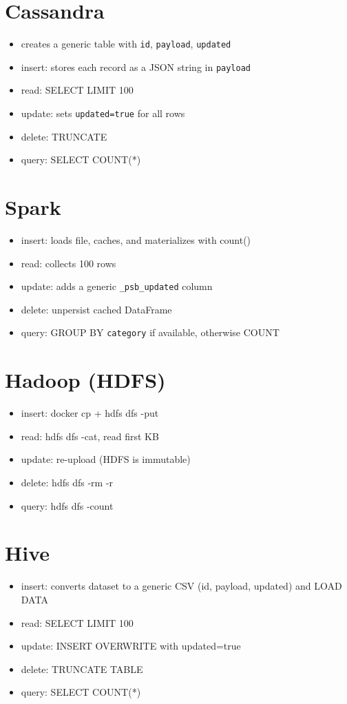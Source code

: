 \documentclass[12pt]{report}
\begin{document}
\section{Cassandra}
\begin{itemize}
  \item creates a generic table with \texttt{id}, \texttt{payload}, \texttt{updated}
  \item insert: stores each record as a JSON string in \texttt{payload}
  \item read: SELECT LIMIT 100
  \item update: sets \texttt{updated=true} for all rows
  \item delete: TRUNCATE
  \item query: SELECT COUNT(*)
\end{itemize}

\section{Spark}
\begin{itemize}
  \item insert: loads file, caches, and materializes with count()
  \item read: collects 100 rows
  \item update: adds a generic \texttt{\_psb\_updated} column
  \item delete: unpersist cached DataFrame
  \item query: GROUP BY \texttt{category} if available, otherwise COUNT
\end{itemize}

\section{Hadoop (HDFS)}
\begin{itemize}
  \item insert: docker cp + hdfs dfs -put
  \item read: hdfs dfs -cat, read first KB
  \item update: re-upload (HDFS is immutable)
  \item delete: hdfs dfs -rm -r
  \item query: hdfs dfs -count
\end{itemize}

\section{Hive}
\begin{itemize}
  \item insert: converts dataset to a generic CSV (id, payload, updated) and LOAD DATA
  \item read: SELECT LIMIT 100
  \item update: INSERT OVERWRITE with updated=true
  \item delete: TRUNCATE TABLE
  \item query: SELECT COUNT(*)
\end{itemize}
\end{document}
